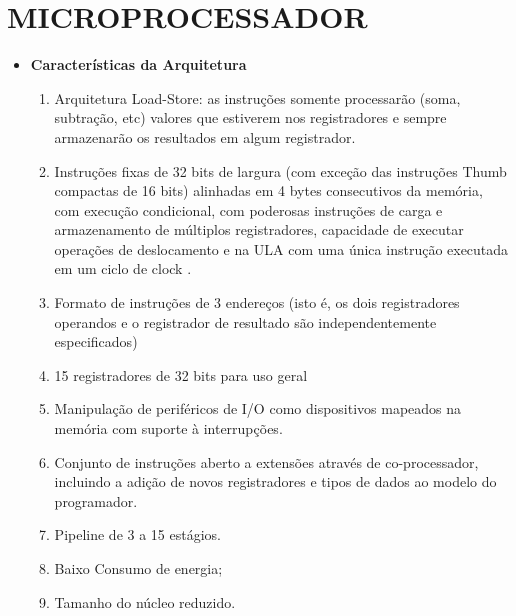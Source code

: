 \chapter{MICROPROCESSADOR}

\begin{itemize}

\item \textbf{Características da Arquitetura}

\begin{enumerate}
	\item Arquitetura Load-Store: as instruções somente processarão (soma, subtração, etc) valores que estiverem nos registradores e sempre armazenarão os resultados em algum registrador.
	\item Instruções fixas de 32 bits de largura (com exceção das instruções Thumb compactas de 16 bits) alinhadas em 4 bytes consecutivos da memória, com execução condicional, com poderosas instruções de carga e armazenamento de múltiplos registradores, capacidade de executar operações de deslocamento e na ULA com uma única instrução executada em um ciclo de clock .
	\item Formato de instruções de 3 endereços (isto é, os dois registradores operandos e o registrador de resultado são independentemente especificados)
	\item 15 registradores de 32 bits para uso geral
	\item Manipulação de periféricos de I/O como dispositivos mapeados na memória com suporte à interrupções.
	\item Conjunto de instruções aberto a extensões através de co-processador, incluindo a adição de novos registradores e tipos de dados ao modelo do programador.
	\item Pipeline de 3 a 15 estágios.
	\item Baixo Consumo de energia;
	\item Tamanho do núcleo reduzido.
\end{enumerate}

\end{itemize}